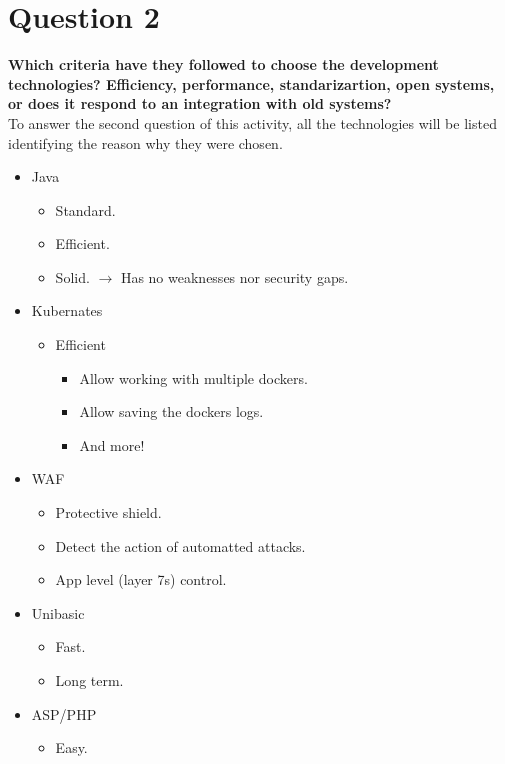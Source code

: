 \documentclass[12pt]{article}
\begin{document}
\section*{Question 2}
\textbf{Which criteria have they followed to choose the development technologies? Efficiency, performance, standarizartion, open systems, or does it respond to an integration with old systems?}\\
To answer the second question of this activity, all the technologies will be listed identifying the reason why they were chosen.
\begin{itemize}
    \item Java
    \begin{itemize}
        \item Standard.
        \item Efficient.
        \item Solid. $\longrightarrow$ Has no weaknesses nor security gaps.
    \end{itemize}
    \item Kubernates
    \begin{itemize}
        \item Efficient
        \begin{itemize}
            \item Allow working with multiple dockers.
            \item Allow saving the dockers logs.
            \item And more!
        \end{itemize}
    \end{itemize}
    \item WAF
    \begin{itemize}
        \item Protective shield.
        \item Detect the action of automatted attacks.
        \item App level (layer 7s) control.
    \end{itemize}
    \item Unibasic
    \begin{itemize}
        \item Fast.
        \item Long term.
    \end{itemize}
    \item ASP/PHP
    \begin{itemize}
        \item Easy.
    \end{itemize}

\end{itemize}
\end{document}
